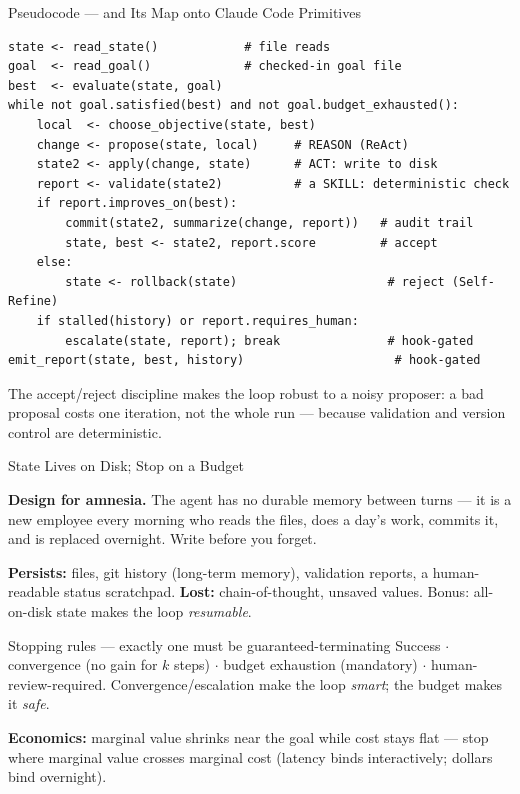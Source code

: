 \documentclass[9pt,t]{beamer}
\begin{document}
\begin{frame}[fragile]{Pseudocode --- and Its Map onto Claude Code Primitives}

\begin{lstlisting}[language={}]
state <- read_state()            # file reads
goal  <- read_goal()             # checked-in goal file
best  <- evaluate(state, goal)
while not goal.satisfied(best) and not goal.budget_exhausted():
    local  <- choose_objective(state, best)
    change <- propose(state, local)     # REASON (ReAct)
    state2 <- apply(change, state)      # ACT: write to disk
    report <- validate(state2)          # a SKILL: deterministic check
    if report.improves_on(best):
        commit(state2, summarize(change, report))   # audit trail
        state, best <- state2, report.score         # accept
    else:
        state <- rollback(state)                     # reject (Self-Refine)
    if stalled(history) or report.requires_human:
        escalate(state, report); break               # hook-gated
emit_report(state, best, history)                     # hook-gated
\end{lstlisting}

\smallskip
The accept/reject discipline makes the loop \alert{robust to a noisy proposer}: a
bad proposal costs one iteration, not the whole run --- because validation and
version control are deterministic.
\end{frame}

\begin{frame}{State Lives on Disk; Stop on a Budget}

\begin{bigpicture}
\textbf{Design for amnesia.} The agent has no durable memory between turns ---
it is a new employee every morning who reads the files, does a day's work, commits
it, and is replaced overnight. \alert{Write before you forget.}
\end{bigpicture}

\medskip
\textbf{Persists:} files, git history (long-term memory), validation reports, a
human-readable status scratchpad. \textbf{Lost:} chain-of-thought, unsaved
values. Bonus: all-on-disk state makes the loop \emph{resumable}.

\medskip
\begin{block}{Stopping rules --- exactly one must be guaranteed-terminating}
Success $\cdot$ convergence (no gain for $k$ steps) $\cdot$ \alert{budget
exhaustion (mandatory)} $\cdot$ human-review-required. Convergence/escalation make
the loop \emph{smart}; the budget makes it \emph{safe}.
\end{block}

\medskip
\textbf{Economics:} marginal value shrinks near the goal while cost stays flat ---
stop where marginal value crosses marginal cost (latency binds interactively;
dollars bind overnight).
\end{frame}
\end{document}

